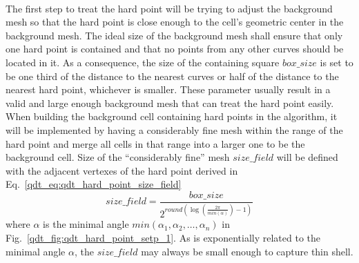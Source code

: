 \paragraph{}
The first step to treat the hard point will be trying to adjust the background mesh so that the hard point is close enough to the cell's geometric center in the background mesh.
The ideal size of the background mesh shall ensure that only one hard point is contained and that no points from any other curves should be located in it.
As a consequence, the size of the containing square $box\_size$ is set to be one third of the distance to the nearest curves or half of the distance to the nearest hard point, whichever is smaller.
These parameter usually result in a valid and large enough background mesh that can treat the hard point easily. 
When building the background cell containing hard points in the algorithm, it will be implemented by having a considerably fine mesh within the range of the hard point and merge all cells in that range into a larger one to be the background cell.
Size of the ``considerably fine'' mesh $size\_field$ will be defined with the adjacent vertexes of the hard point derived in Eq.~\ref{qdt_eq:qdt_hard_point_size_field}
    \begin{equation}
        size\_field = \frac{box\_size}{
            2^{
                round(
                    \log(\frac{2 \pi}{ min(\alpha)})-1
                )
            }
        }
    \label{qdt_eq:qdt_hard_point_size_field}
    \end{equation}
where $\alpha$ is the minimal angle $min(\alpha_1, \alpha_2, \dots, \alpha_n)$ in Fig.~\ref{qdt_fig:qdt_hard_point_setp_1}.
As is exponentially related to the minimal angle $\alpha$, the $size\_field$ may always be small enough to capture thin shell.
